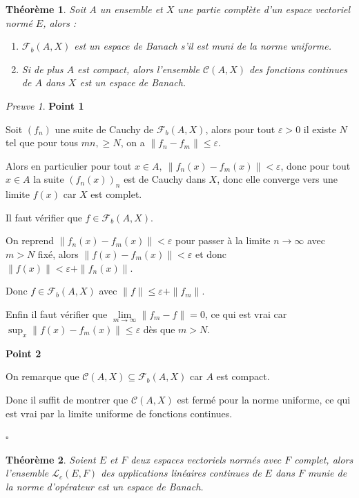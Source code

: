 \documentclass[]{article}
\newtheorem{mythm}{Théorème}
\theoremstyle{remark}
\newtheorem{myproof}{Preuve}
\theoremstyle{definition}
\newcommand{\cqfd}{
	\hfill$\square$
}
\newenvironment{proofpart}[1]{
	\noindent
	{\textbf{\boldmath #1}}
}{
	\checkmark
}
\begin{document}
\begin{mythm}
	Soit $A$ un ensemble et $X$ une partie complète d'un espace vectoriel normé $E$, alors :
	\begin{enumerate}
		\item $\mathcal{F}_b(A, X)$ est un espace de Banach s'il est muni de la norme uniforme.
		
		\item Si de plus $A$ est compact, alors l'ensemble $\mathcal{C}(A, X)$ des fonctions continues de $A$ dans $X$ est un espace de Banach.
	\end{enumerate}
\end{mythm}

\begin{myproof}
	\begin{proofpart}{Point 1}
		Soit $(f_n)$ une suite de Cauchy de $\mathcal{F}_b(A, X)$, alors pour tout $\varepsilon > 0$ il existe $N$ tel que pour tous $mn , \geqslant N$, on a $\|f_n - f_m\| \leqslant \varepsilon$.
		
		Alors en particulier pour tout $x \in A, ~ \|f_n(x) - f_m(x)\| < \varepsilon$, donc pour tout $x \in A$ la suite $(f_n(x))_n$ est de Cauchy dans $X$, donc elle converge vers une limite $f(x)$ car $X$ est complet.
		
		Il faut vérifier que $f \in \mathcal{F}_b(A, X)$.
		
		On reprend $\|f_n(x) - f_m(x)\| < \varepsilon$ pour passer à la limite $n \rightarrow \infty$ avec $m > N$ fixé, alors $\|f(x)-f_m(x)\| < \varepsilon$ et donc $\|f(x)\| < \varepsilon + \|f_n(x)\|$.
		
		Donc $f \in \mathcal{F}_b(A, X)$ avec $\|f\| \leqslant \varepsilon + \|f_m\|$.
		
		Enfin il faut vérifier que $\lim\limits_{m \to \infty} \|f_m - f\| = 0$, ce qui est vrai car $\sup_x \|f(x) - f_m(x)\| \leqslant \varepsilon$ dès que $m > N$.
	\end{proofpart}
	
	\begin{proofpart}{Point 2}
		On remarque que $\mathcal{C}(A, X) \subseteq \mathcal{F}_b(A, X)$ car $A$ est compact.
		
		Donc il suffit de montrer que $\mathcal{C}(A, X)$ est fermé pour la norme uniforme, ce qui est vrai par la limite uniforme de fonctions continues.
	\end{proofpart}
	
	\cqfd
\end{myproof}

\begin{mythm}
	Soient $E$ et $F$ deux espaces vectoriels normés avec $F$ complet, alors l'ensemble $\mathcal{L}_c(E, F)$ des applications linéaires continues de $E$ dans $F$ munie de la norme d'opérateur est un espace de Banach.
\end{mythm}
\end{document}
